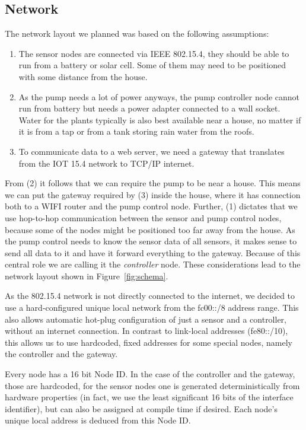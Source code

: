 \documentclass[11pt,paper=a4,parskip=half]{scrartcl}
\begin{document}
\subsection{Network}
The network layout we planned was based on the following assumptions:
\begin{enumerate}
  \item The sensor nodes are connected via IEEE 802.15.4, they should be able to run
	from a battery or solar cell. Some of them may need to be positioned
	with some distance from the house.
  \item As the pump needs a lot of power anyways, the pump controller node
	cannot run from battery but needs a power adapter connected to a wall
	socket. Water for the plants typically is also best available
	near a house, no matter if it is from a tap or from a tank
	storing rain water from the roofs.
  \item To communicate data to a web server, we need a gateway that translates
	from the IOT 15.4 network to TCP/IP internet.
\end{enumerate}

From (2) it follows that we can require the pump to be near a house. This means
we can put the gateway required by (3) inside the house, where it has
connection both to a WIFI router and the pump control node. Further, (1)
dictates that we use hop-to-hop communication between the sensor and pump
control nodes, because some of the nodes might be positioned too far away from
the house. As the pump control needs to know the sensor data of all sensors, it
makes sense to send all data to it and have it forward everything to the
gateway. Because of this central role we are calling it the \emph{controller}
node. These considerations lead to the network layout shown in
Figure~\ref{fig:schema}.

As the 802.15.4 network is not directly connected to the internet, we decided
to use a hard-configured unique local network from the fc00::/8 address
range\cite{rfc4193}. This also allows automatic hot-plug configuration of
just a sensor and a controller, without an internet connection. In contrast
to link-local addresses (fe80::/10), this allows us to use hardcoded, fixed
addresses for some special nodes, namely the controller and the gateway.

Every node has a 16 bit Node ID. In the case of the controller and the gateway,
those are hardcoded, for the sensor nodes one is generated deterministically
from hardware properties (in fact, we use the least significant 16 bits of the
interface identifier), but can also be assigned at compile time if desired.
Each node's unique local address is deduced from this Node ID.
\end{document}
